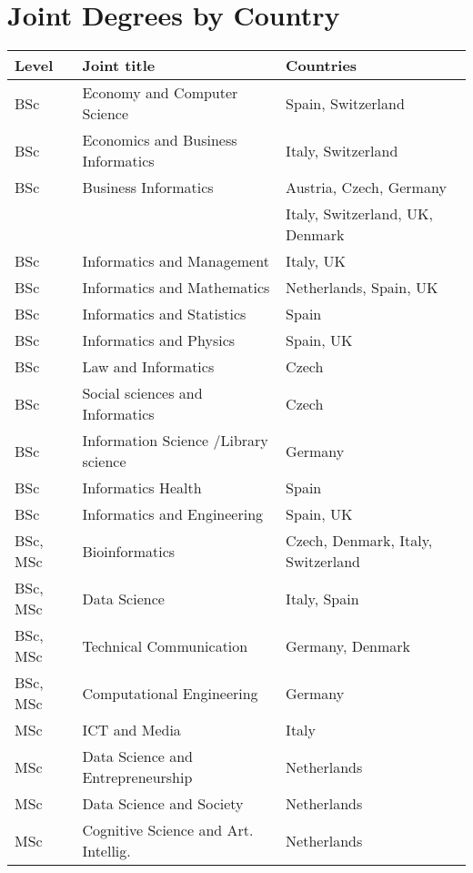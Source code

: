 \section{Joint Degrees by Country}\label{apx:teaching}
\small{
\begin{table}[h]
\begin{center}
\label{tab:unis}
\begin{tabular}  {|l|l|l|}
\hline
{\bf Level}&{\bf Joint title} & {\bf Countries}\\
\hline
BSc & Economy and Computer Science & Spain, Switzerland \\
\hline
BSc & Economics and Business Informatics & Italy, Switzerland \\
\hline
BSc & Business Informatics  &  Austria, Czech, Germany \\
                                             &&Italy, Switzerland, UK, Denmark\\
\hline
BSc & Informatics and Management    & Italy,  UK \\
\hline
BSc & Informatics and Mathematics   & Netherlands, Spain, UK\\
\hline
BSc & Informatics and Statistics   & Spain\\
\hline
BSc & Informatics and Physics   & Spain, UK\\
\hline
BSc & Law and Informatics   &  Czech \\
\hline
BSc & Social sciences and Informatics   & Czech \\
\hline
BSc & Information Science /Library science   & Germany\\
\hline
BSc & Informatics Health  &Spain\\
\hline
BSc & Informatics and  Engineering   & Spain,  UK\\
\hline
BSc, MSc & Bioinformatics  & Czech, Denmark, Italy, Switzerland\\
\hline
BSc, MSc & Data Science   & Italy, Spain\\
\hline
BSc, MSc & Technical Communication    & Germany, Denmark\\
\hline
BSc, MSc & Computational Engineering   & Germany\\
\hline
MSc & ICT and Media   & Italy\\
\hline
MSc & Data Science and Entrepreneurship   & Netherlands\\
\hline
MSc & Data Science and Society   & Netherlands\\
\hline
MSc & Cognitive Science and Art. Intellig.   & Netherlands\\

\end{tabular}
\end{center}
\end{table}}
